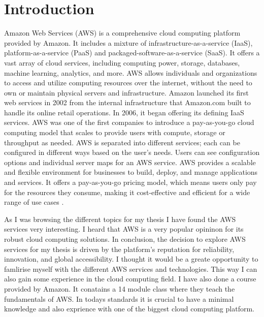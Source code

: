 \documentclass[11pt,a4paper,oneside]{report}
\begin{document}


\newpage
\tableofcontents
\pagebreak

\chapter{Introduction}

Amazon Web Services (AWS) is a comprehensive cloud computing platform provided by Amazon.
It includes a mixture of infrastructure-as-a-service (IaaS), platform-as-a-service (PaaS) and packaged-software-as-a-service (SaaS).
It offers a vast array of cloud services, including computing power, storage, databases, machine learning, analytics, and more.
AWS allows individuals and organizations to access and utilize computing resources over the internet, without the need to own or maintain physical servers and infrastructure.
Amazon launched its first web services in 2002 from the internal infrastructure that Amazon.com built to handle its online retail operations.
In 2006, it began offering its defining IaaS services. AWS was one of the first companies to introduce a pay-as-you-go cloud computing model that scales to provide users with compute, storage or throughput as needed.
AWS is separated into different services; each can be configured in different ways based on the user's needs.
Users can see configuration options and individual server maps for an AWS service.
AWS provides a scalable and flexible environment for businesses to build, deploy, and manage applications and services.
It offers a pay-as-you-go pricing model, which means users only pay for the resources they consume, making it cost-effective and efficient for a wide range of use cases \cite{techtagaws}.

As I was browsing the different topics for my thesis I have found the AWS services very interesting. I heard that AWS is a very popular opininon for its robust cloud computing solutions.
In conclusion, the decision to explore AWS services for my thesis is driven by the platform's reputation for reliability, innovation, and global accessibility. I thought it would be a greate opportunity to famlirise myself with the different AWS services and technologies.
This way I can also gain some experience in the cloud computing field. I have also done a course provided by Amazon. It conatains a 14 module class where they teach the fundamentals of AWS. In todays standards it is crucial to have a minimal knowledge and also exprience with one of the biggest cloud computing platform.
\end{document}
